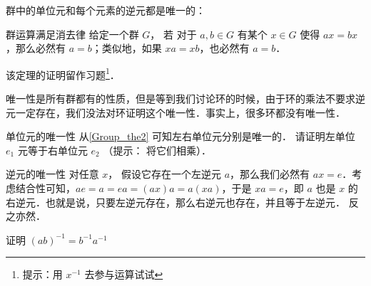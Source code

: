 群中的单位元和每个元素的逆元都是唯一的：

\begin{theorem}{群运算满足消去律}\label{Group_the2}
给定一个群 $G$， 若 对于 $ a, b\in G$ 有某个 $x\in G$ 使得 $ax=bx$，那么必然有 $a=b$；类似地，如果 $xa=xb$，也必然有 $a=b$．
\end{theorem}

该定理的证明留作习题\footnote{提示：用 $x^{-1}$ 去参与运算试试}．

唯一性是所有群都有的性质，但是等到我们讨论环的时候，由于环的乘法不要求逆元一定存在，我们没法对环证明这个唯一性．事实上，很多环都没有唯一性．

\begin{exercise}{单位元的唯一性}
从\autoref{Group_the2} 可知左右单位元分别是唯一的． 请证明左单位 $e_1$ 元等于右单位元 $e_2$ （提示： 将它们相乘）．
\end{exercise}

\begin{theorem}{逆元的唯一性}\label{Group_the1}
对任意 $x$， 假设它存在一个左逆元 $a$，那么我们必然有 $ax=e$．考虑结合性可知，$ae=a=ea=(ax)a=a(xa)$，于是 $xa=e$，即 $a$ 也是 $x$ 的右逆元．也就是说，只要左逆元存在，那么右逆元也存在，并且等于左逆元． 反之亦然．
\end{theorem}

\begin{exercise}{}
证明 $(ab)^{-1} = b^{-1}a^{-1}$
\end{exercise}
